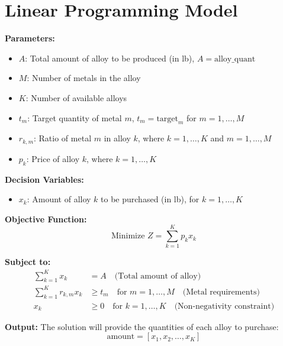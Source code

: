 \documentclass{article}
\begin{document}
\section*{Linear Programming Model}

\textbf{Parameters:}
\begin{itemize}
    \item $A$: Total amount of alloy to be produced (in lb), $A = \text{alloy\_quant}$
    \item $M$: Number of metals in the alloy
    \item $K$: Number of available alloys
    \item $t_m$: Target quantity of metal $m$, $t_m = \text{target}_m$ for $m = 1, \ldots, M$
    \item $r_{k,m}$: Ratio of metal $m$ in alloy $k$, where $k = 1, \ldots, K$ and $m = 1, \ldots, M$
    \item $p_k$: Price of alloy $k$, where $k = 1, \ldots, K$
\end{itemize}

\textbf{Decision Variables:}
\begin{itemize}
    \item $x_k$: Amount of alloy $k$ to be purchased (in lb), for $k = 1, \ldots, K$
\end{itemize}

\textbf{Objective Function:}
\[
\text{Minimize } Z = \sum_{k=1}^{K} p_k x_k
\]

\textbf{Subject to:}
\begin{align}
    \sum_{k=1}^{K} x_k &= A \quad \text{(Total amount of alloy)} \\
    \sum_{k=1}^{K} r_{k,m} x_k &\geq t_m \quad \text{for } m = 1, \ldots, M \quad \text{(Metal requirements)} \\
    x_k &\geq 0 \quad \text{for } k = 1, \ldots, K \quad \text{(Non-negativity constraint)}
\end{align}

\textbf{Output:}
The solution will provide the quantities of each alloy to purchase:
\[
\text{amount} = [x_1, x_2, \ldots, x_K]
\]
\end{document}

